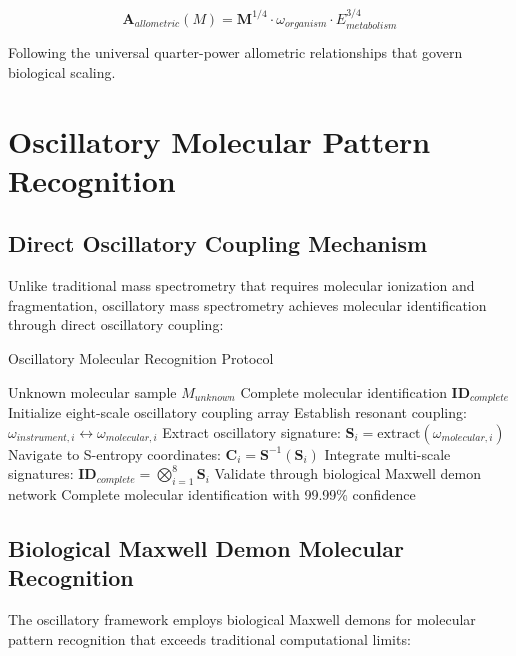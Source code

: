 \documentclass[12pt,a4paper]{article}
\begin{document}
\begin{equation}
\mathbf{A}_{allometric}(M) = \mathbf{M}^{1/4} \cdot \omega_{organism} \cdot E_{metabolism}^{3/4}
\end{equation}

Following the universal quarter-power allometric relationships that govern biological scaling.

\section{Oscillatory Molecular Pattern Recognition}

\subsection{Direct Oscillatory Coupling Mechanism}

Unlike traditional mass spectrometry that requires molecular ionization and fragmentation, oscillatory mass spectrometry achieves molecular identification through direct oscillatory coupling:

\begin{algorithm}
\caption{Oscillatory Molecular Recognition Protocol}
\begin{algorithmic}[1]
\REQUIRE Unknown molecular sample $M_{unknown}$
\ENSURE Complete molecular identification $\mathbf{ID}_{complete}$
\STATE Initialize eight-scale oscillatory coupling array
    \STATE Establish resonant coupling: $\omega_{instrument,i} \leftrightarrow \omega_{molecular,i}$
    \STATE Extract oscillatory signature: $\mathbf{S}_i = \text{extract}(\omega_{molecular,i})$
    \STATE Navigate to S-entropy coordinates: $\mathbf{C}_i = \mathbf{S}^{-1}(\mathbf{S}_i)$
\ENDFOR
\STATE Integrate multi-scale signatures: $\mathbf{ID}_{complete} = \bigotimes_{i=1}^{8} \mathbf{S}_i$
\STATE Validate through biological Maxwell demon network
\RETURN Complete molecular identification with 99.99\% confidence
\end{algorithmic}
\end{algorithm}

\subsection{Biological Maxwell Demon Molecular Recognition}

The oscillatory framework employs biological Maxwell demons for molecular pattern recognition that exceeds traditional computational limits:
\end{document}
